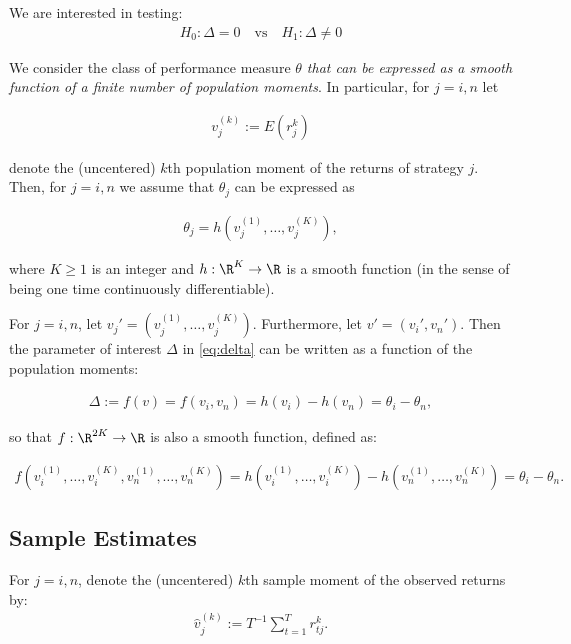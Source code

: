 \documentclass[12pt,oneside,a4paper]{article}
\begin{document}
We are interested in testing:
\begin{align*} \label{eq:hyp}
	H_{0}: \Delta = 0 \quad \text{vs} \quad	H_{1}: \Delta \neq 0  
\end{align*}

We consider the class of performance measure \textit{$\theta$ that can be expressed as a smooth function of a finite number of population moments}.
In particular, for $j=i,n$ let

\begin{align*}
	v_{j}^{(k)} := E(r_{j}^k)
\end{align*}

\noindent
denote the (uncentered) $k$th population moment of the returns of strategy $j$.
Then, for $j=i,n$ we assume that $\theta_{j}$ can be expressed as

\begin{align*}
	\theta_{j} = h( v_{j}^{(1)}, \dots, v_{j}^{(K)}), 
\end{align*}

\noindent
where $K \geq1$ is an integer and $h: \R^{K} \to \R$ is a smooth function (in the sense of being one time continuously differentiable).

For $j=i,n$, let $v_{j}'= (v_{j}^{(1)}, \dots, v_{j}^{(K)})$.
Furthermore, let $v'= (v_{i}', v_{n}')$.
Then the parameter of interest $\Delta$ in \eqref{eq:delta} can be written as a function of the population moments:

\begin{align*}
	\Delta := f(v) = f(v_{i} , v_{n}) = h(v_{i}) - h(v_{n}) = \theta_{i} - \theta_{n}, 
\end{align*}

so that $f: \R^{2K} \to \R$ is also a smooth function, defined as:

\begin{align}\label{eq:delta:fn}
	f(v_{i}^{(1)}, \dots, v_{i}^{(K)}, v_{n}^{(1)}, \dots, v_{n}^{(K)})  =
	h(v_{i}^{(1)}, \dots, v_{i}^{(K)})  -
	h(v_{n}^{(1)}, \dots, v_{n}^{(K)}) =
	\theta_{i} - \theta_{n}.
\end{align}

\subsection{Sample Estimates}

For $j=i,n$, denote the (uncentered) $k$th sample moment of the observed returns by:
\begin{align*}
	\hat{v}_{j}^{(k)} := T^{-1} \sum_{t=1}^T r_{tj}^{k}.
\end{align*}
\end{document}
